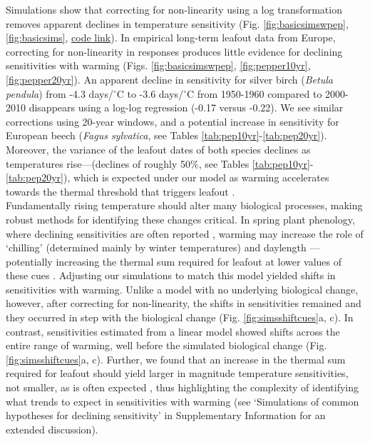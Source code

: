 \documentclass[11pt,letter]{article}
\newcommand{\R}[1]{\label{#1}\linelabel{#1}}
\begin{document}
Simulations show that correcting for non-linearity using a log transformation removes apparent declines in temperature sensitivity (Fig. \ref{fig:basicsimswpep}, \ref{fig:basicsims}, \href{https://github.com/temporalecologylab/labgit/tree/master/projects/decsenspost}{code link}). In empirical long-term leafout data from Europe, correcting for non-linearity in responses\R{semantic3} produces little evidence for declining sensitivities with warming (Figs. \ref{fig:basicsimswpep}, \ref{fig:pepper10yr}, \ref{fig:pepper20yr}). An apparent decline in sensitivity for silver birch (\emph{Betula pendula}) from -4.3 days/$^{\circ}$C to -3.6 days/$^{\circ}$C from 1950-1960 compared to 2000-2010 disappears using a log-log regression (-0.17 versus -0.22). We see similar corrections using 20-year windows, and a potential increase in sensitivity for European beech (\emph{Fagus sylvatica}, see Tables \ref{tab:pep10yr}-\ref{tab:pep20yr}). Moreover, the variance of the leafout dates of both species declines as temperatures rise---(declines of roughly 50\%, see Tables \ref{tab:pep10yr}-\ref{tab:pep20yr}), which is expected under our model as warming accelerates towards the thermal threshold that triggers leafout \citep[and in contrast to predictions from changing mechanisms, see][]{ford2016}. \\

\R{biomattersstart}Fundamentally rising temperature should alter many biological processes, making robust methods for identifying these changes critical. In spring plant phenology, where declining sensitivities are often reported \citep{fu2015,piao2017,dai2019ag}, warming may increase the role of `chilling' (determined mainly by winter temperatures) and daylength \citep{Laube:2014a,zohner2016}---potentially increasing the thermal sum required for leafout at lower values of these cues \citep{Polgar2014,zohner2017,flynn2018}.\R{R4end} Adjusting our simulations to match this model yielded shifts in sensitivities with warming. Unlike a model with no underlying biological change, however, after correcting for non-linearity, the shifts in sensitivities remained and they occurred in step with the biological change (Fig. \ref{fig:simsshiftcues}a, c). In contrast, sensitivities estimated from a linear model showed shifts across the entire range of warming, well before the simulated biological change (Fig. \ref{fig:simsshiftcues}a, c). Further, we found that an increase in the thermal sum required for leafout should yield larger in magnitude temperature sensitivities, not smaller, as is often expected \citep[e.g.,][]{fu2015}, thus highlighting the complexity of identifying what trends to expect in sensitivities with warming (see `Simulations of common hypotheses for declining sensitivity' in Supplementary Information for an extended discussion).\R{biomattersend}  \\ %
\end{document}
